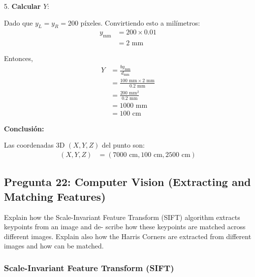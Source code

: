 \documentclass{article}
\begin{document}
5. \textbf{Calcular \(Y\)}:

Dado que \(y_L = y_R = 200\) píxeles. Convirtiendo esto a milímetros:
\begin{align}
    y_{\text{mm}} &= 200 \times 0.01 \\
    &= 2 \text{ mm}
\end{align}

Entonces,
\begin{align}
    Y &= \frac{by_{\text{mm}}}{d_{\text{mm}}} \\
    &= \frac{100 \text{ mm} \times 2 \text{ mm}}{0.2 \text{ mm}} \\
    &= \frac{200 \text{ mm}^2}{0.2 \text{ mm}} \\
    &= 1000 \text{ mm} \\
    &= 100 \text{ cm}
\end{align}

\textbf{Conclusión:}

Las coordenadas 3D \((X, Y, Z)\) del punto son:
\begin{align}
    (X, Y, Z) &= (7000 \text{ cm}, 100 \text{ cm}, 2500 \text{ cm})
\end{align}


\subsection{Pregunta 22: Computer Vision (Extracting and Matching Features)}

Explain how the Scale-Invariant Feature Transform (SIFT) algorithm extracts keypoints from an image and de- scribe how these keypoints are matched across different images. Explain also how the Harris Corners are extracted from different images and how can be matched.

\subsubsection{Scale-Invariant Feature Transform (SIFT)}
\end{document}

